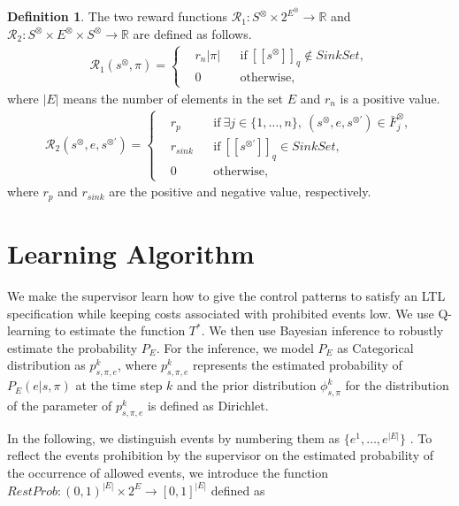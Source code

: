 \documentclass[10 pt, dvipdfmx]{article}
\theoremstyle{definition}
\newtheorem{definition}{Definition}[section]
\newcommand{\myspq}{\ensuremath{[\![s^{\otimes}]\!]}_q}
\newcommand{\myspdq}{\ensuremath{[\![s^{\otimes \prime}]\!]}_q}
\begin{document}
\begin{definition}
  The two reward functions $\mathcal{R}_1 : S^{\otimes} \times 2^{E^{\otimes}} \rightarrow \mathbb{R}$ and $\mathcal{R}_2 : S^{\otimes} \times E^{\otimes} \times S^{\otimes} \rightarrow \mathbb{R}$ are defined as follows.
  \begin{align}
    \mathcal{R}_1 (s^{\otimes}, \pi) =
    \left\{
    \begin{aligned}
      & r_{n}|\pi| & &\text{if} \ \myspq \notin SinkSet , \\
      & 0 & &\text{otherwise},
    \end{aligned}
    \right.
  \end{align}
  where $|E|$ means the number of elements in the set $E$ and $r_{n}$ is a positive value.
  \begin{align}
    \mathcal{R}_2(s^{\otimes}, e, s^{\otimes \prime}) =
    \left\{
    \begin{aligned}
      &r_p & & \text{if}\ \exists j \in \! \{ 1, \ldots ,n \},\ (s^{\otimes}, e, s^{\otimes \prime}) \in \bar{F}^{\otimes}_j \!,\\
      &r_{sink} & & \text{if}\ \myspdq \in SinkSet,\\
      &0 & & \text{otherwise},
    \end{aligned}
    \right.
  \end{align}
  where $r_p$ and $r_{sink}$ are the positive and negative value, respectively.
  \label{reward_def}
\end{definition}

\section{Learning Algorithm}
We make the supervisor learn how to give the control patterns to satisfy an LTL specification while keeping costs associated with prohibited events low. We use Q-learning to estimate the function $T^{\ast}$. We then use Bayesian inference to robustly estimate the probability $P_E$. For the inference, we model $P_E$ as Categorical distribution as $p^k_{s,\pi,e}$, where $p^k_{s,\pi,e}$ represents the estimated probability of $P_E(e|s,\pi)$ at the time step $k$ and the prior distribution $\phi^k_{s,\pi}$ for the distribution of the parameter of $p^k_{s,\pi,e}$ is defined as Dirichlet.

In the following, we distinguish events by numbering them as $\{ e^1, \ldots, e^{|E|} \}$ . To reflect the events prohibition by the supervisor on the estimated probability of the occurrence of allowed events, we introduce the function $RestProb : (0,1)^{|E|} \times 2^E \rightarrow [0,1]^{|E|}$ defined as
\end{document}
